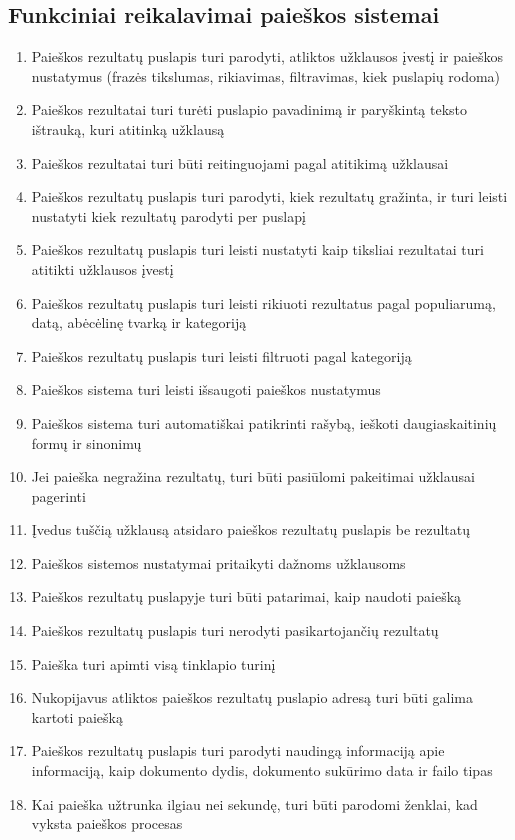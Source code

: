 \documentclass{VUMIFPSkursinis}
\begin{document}
\subsection{Funkciniai reikalavimai paieškos sistemai}
\begin{enumerate}
	\item Paieškos rezultatų puslapis turi parodyti, atliktos užklausos įvestį ir paieškos nustatymus (frazės tikslumas, rikiavimas, filtravimas, kiek puslapių rodoma)
	\item Paieškos rezultatai turi turėti puslapio pavadinimą ir paryškintą teksto ištrauką, kuri atitinką užklausą
	\item Paieškos rezultatai turi būti reitinguojami pagal atitikimą užklausai
	\item Paieškos rezultatų puslapis turi parodyti, kiek rezultatų gražinta, ir turi leisti nustatyti kiek rezultatų parodyti per puslapį
	\item Paieškos rezultatų puslapis turi leisti nustatyti kaip tiksliai rezultatai turi atitikti užklausos įvestį
	\item Paieškos rezultatų puslapis turi leisti rikiuoti rezultatus pagal populiarumą, datą, abėcėlinę tvarką ir kategoriją
	\item Paieškos rezultatų puslapis turi leisti filtruoti pagal kategoriją
	\item Paieškos sistema turi leisti išsaugoti paieškos nustatymus
	\item Paieškos sistema turi automatiškai patikrinti rašybą, ieškoti daugiaskaitinių formų ir sinonimų
	\item Jei paieška negražina rezultatų, turi būti pasiūlomi pakeitimai užklausai pagerinti
	\item Įvedus tuščią užklausą atsidaro paieškos rezultatų puslapis be rezultatų
	\item Paieškos sistemos nustatymai pritaikyti dažnoms užklausoms
	\item Paieškos rezultatų puslapyje turi būti patarimai, kaip naudoti paiešką
	\item Paieškos rezultatų puslapis turi nerodyti pasikartojančių rezultatų
	\item Paieška turi apimti visą tinklapio turinį
	\item Nukopijavus atliktos paieškos rezultatų puslapio adresą turi būti galima kartoti paiešką
	\item Paieškos rezultatų puslapis turi parodyti naudingą informaciją apie informaciją, kaip dokumento dydis, dokumento sukūrimo data ir failo tipas
	\item Kai paieška užtrunka ilgiau nei sekundę, turi būti parodomi ženklai, kad vyksta paieškos procesas
\end{enumerate}
\end{document}
